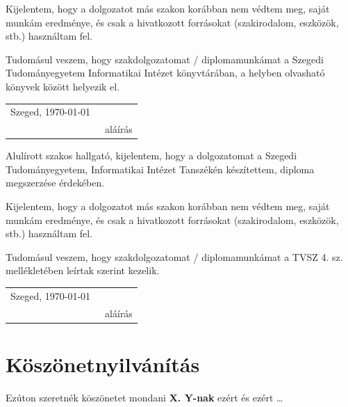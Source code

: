 \documentclass[12pt]{report}
\theoremstyle{definition}
\begin{document}
Kijelentem, hogy a dolgozatot más szakon korábban nem védtem meg, saját munkám eredménye, és csak a hivatkozott forrásokat (szakirodalom, eszközök, stb.) használtam fel.

Tudomásul veszem, hogy szakdolgozatomat / diplomamunkámat a Szegedi Tudományegyetem Informatikai Intézet könyvtárában, a helyben olvasható könyvek között helyezik el.

\vspace*{2cm}

\begin{tabular}{lc}
	Szeged, \today\
	\hspace{2cm} & \makebox[6cm]{\dotfill} \\
	             & aláírás                 \\
\end{tabular}


\vspace*{4cm}


\noindent
Alulírott \makebox[4cm]{\dotfill} szakos hallgató, kijelentem, hogy a dolgozatomat a Szegedi Tudományegyetem, Informatikai Intézet \makebox[4cm]{\dotfill} Tanszékén készítettem, \makebox[4cm]{\dotfill} diploma megszerzése érdekében.

Kijelentem, hogy a dolgozatot más szakon korábban nem védtem meg, saját munkám eredménye, és csak a hivatkozott forrásokat (szakirodalom, eszközök, stb.) használtam fel.

Tudomásul veszem, hogy szakdolgozatomat / diplomamunkámat a TVSZ 4. sz. mellékletében leírtak szerint kezelik.

\vspace*{2cm}

\begin{tabular}{lc}
	Szeged, \today\
	\hspace{2cm} & \makebox[6cm]{\dotfill} \\
	             & aláírás                 \\
\end{tabular}





\chapter*{Köszönetnyilvánítás}

Ezúton szeretnék köszönetet mondani \textbf{X. Y-nak} ezért és ezért \ldots
\end{document}
